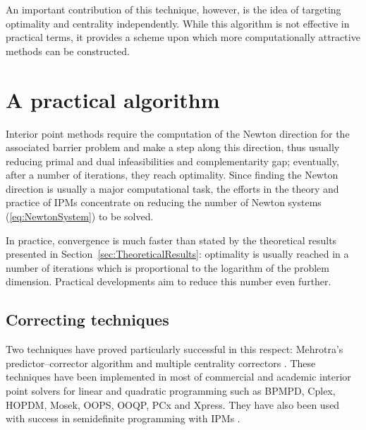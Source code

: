 An important contribution of this technique, however, is the idea 
of targeting optimality and centrality independently. While this 
algorithm is not effective in practical terms, it provides a scheme 
upon which more computationally attractive methods can be constructed.


%
%
%
\section{A practical algorithm}

Interior point methods require the computation of the Newton 
direction for the associated barrier problem and make a step along 
this direction, thus usually reducing primal and dual infeasibilities 
and complementarity gap; eventually, after a number of iterations, 
they reach optimality. 
Since finding the Newton direction is usually a major computational task, 
the efforts in the theory and practice of IPMs concentrate on reducing 
the number of Newton systems (\ref{eq:NewtonSystem}) to be solved.

In practice, convergence is much faster than stated by the theoretical
results presented in Section~\ref{sec:TheoreticalResults}: 
optimality is usually reached in a number of iterations which is 
proportional to the logarithm of the problem dimension. Practical 
developments aim to reduce this number even further. 


%
%
\subsection{Correcting techniques}

Two techniques have proved particularly successful in this respect:
Mehrotra's predictor--corrector algorithm \cite{Mehrotra92} 
and multiple centrality correctors \cite{Gondzio96}. These 
techniques have been implemented in most of commercial and academic 
interior point solvers for linear and quadratic programming such 
as BPMPD, Cplex, HOPDM, Mosek, OOPS, OOQP, PCx and Xpress. 
They have also been used with success in semidefinite 
programming with IPMs \cite{Haeberly99}.

